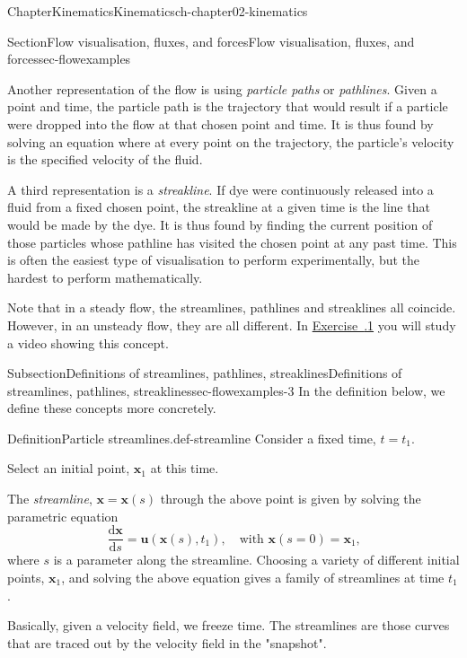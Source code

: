 \documentclass[oneside,10pt,]{book}
\newcommand{\xreffont}{\relax}
\numberwithin{equation}{section}
\newcommand{\de}{\mathrm{d}}
\newcommand{\dd}[2]{\frac{\de#1}{\de#2}}
\newcommand{\bx}{\boldsymbol{x}}
\newcommand{\bu}{\boldsymbol{u}}
\begin{document}
\begin{chapterptx}{Chapter}{Kinematics}{}{Kinematics}{}{}{ch-chapter02-kinematics}
\begin{sectionptx}{Section}{Flow visualisation, fluxes, and forces}{}{Flow visualisation, fluxes, and forces}{}{}{sec-flowexamples}
\begin{introduction}{}
\par
Another representation of the flow is using \emph{particle paths} or \emph{pathlines}. Given a point and time, the particle path is the trajectory that would result if a particle were dropped into the flow at that chosen point and time. It is thus found by solving an equation where at every point on the trajectory, the particle's velocity is the specified velocity of the fluid.%
\par
A third representation is a \emph{streakline}. If dye were continuously released into a fluid from a fixed chosen point, the streakline at a given time is the line that would be made by the dye. It is thus found by finding the current position of those particles whose pathline has visited the chosen point at any past time. This is often the easiest type of visualisation to perform experimentally, but the hardest to perform mathematically.%
\par
Note that in a steady flow, the streamlines, pathlines and streaklines all coincide. However, in an unsteady flow, they are all different. In \hyperlink{ex-video-flow-visualisation}{Exercise~{\xreffont 2.3.1}} you will study a video showing this concept.%
\end{introduction}%
%
%
\typeout{************************************************}
\typeout{************************************************}
%
\begin{subsectionptx}{Subsection}{Definitions of streamlines, pathlines, streaklines}{}{Definitions of streamlines, pathlines, streaklines}{}{}{sec-flowexamples-3}
In the definition below, we define these concepts more concretely.%
\begin{definition}{Definition}{Particle streamlines.}{}{def-streamline}%
Consider a fixed time, \(t = t_1\).%
\par
Select an initial point, \(\bx_1\) at this time.%
\par
The \emph{streamline}, \(\bx = \bx(s)\) through the above point is given by solving the parametric equation%
\begin{equation*}
\dd{\bx}{s} = \bu(\bx(s), t_1), \quad \text{with $\bx(s = 0) = \bx_1$,}
\end{equation*}
where \(s\) is a parameter along the streamline. Choosing a variety of different initial points, \(\bx_1\), and solving the above equation gives a family of streamlines at time \(t_1\).%
\end{definition}
Basically, given a velocity field, we freeze time. The streamlines are those curves that are traced out by the velocity field in the "snapshot".%

\end{subsectionptx}
\end{sectionptx}
\end{chapterptx}
\end{document}
